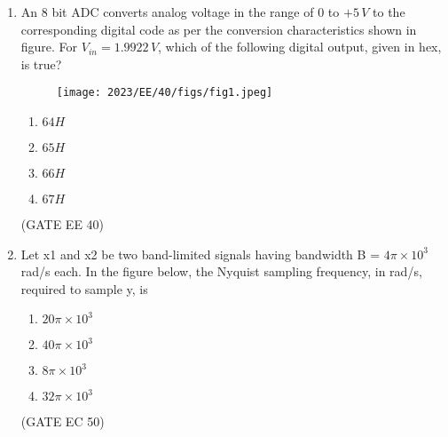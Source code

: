 \begin{enumerate}[label=\thechapter.\arabic*,ref=\thechapter.\theenumi]

\item An $8$ bit ADC converts analog voltage in the range of $0$ to $+5\, V$ to the corresponding digital code as per the conversion characteristics shown in figure. For $V_{in} = 1.9922\, V$, which of the following digital output, given in hex, is true?

\begin{figure}[!h]
    \centering
    \texttt{[image: 2023/EE/40/figs/fig1.jpeg]}
    \caption{}
    \label{fig:ADC_gate.ee.23.40}
\end{figure}
\begin{enumerate}[label=(\alph*)]
    \item $64H$
    \item $65H$
    \item $66H$
    \item $67H$
\end{enumerate} \hfill(GATE EE 40)

\solution

\newpage
\item Let x1 and x2 be two band-limited signals having bandwidth B = $4\pi\times10^3$
rad/s each. In the figure below, the Nyquist sampling frequency, in
rad/s, required to sample y, is
  \\
\begin{enumerate}[label=(\alph*)]
    \item $20\pi\times10^3$
    \item $40\pi\times10^3$
    \item $8\pi\times10^3$
    \item $32\pi\times10^3$
\end{enumerate} \hfill(GATE EC 50)


\solution
\newpage


\end{enumerate}

